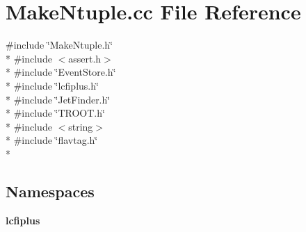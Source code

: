 \section{Make\-Ntuple.\-cc File Reference}
\label{MakeNtuple_8cc}
{\ttfamily \#include \char`\"{}Make\-Ntuple.\-h\char`\"{}}\\*
{\ttfamily \#include $<$assert.\-h$>$}\\*
{\ttfamily \#include \char`\"{}Event\-Store.\-h\char`\"{}}\\*
{\ttfamily \#include \char`\"{}lcfiplus.\-h\char`\"{}}\\*
{\ttfamily \#include \char`\"{}Jet\-Finder.\-h\char`\"{}}\\*
{\ttfamily \#include \char`\"{}T\-R\-O\-O\-T.\-h\char`\"{}}\\*
{\ttfamily \#include $<$string$>$}\\*
{\ttfamily \#include \char`\"{}flavtag.\-h\char`\"{}}\\*
\subsection*{Namespaces}
\begin{DoxyCompactItemize}
\item 
{\bf lcfiplus}
\end{DoxyCompactItemize}
